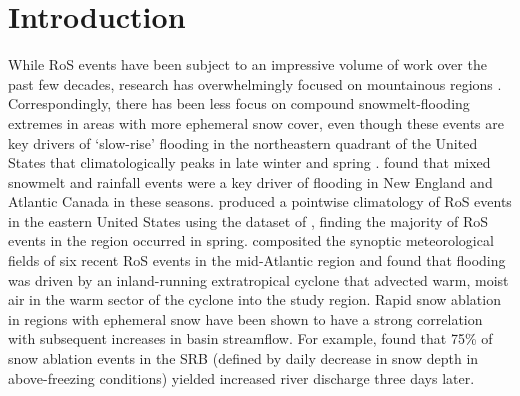 \documentclass[draft]{agujournal2019}
\begin{document}

%
%
%
%


\section{Introduction}

While RoS events have been subject to an impressive volume of work over the past few decades, research has overwhelmingly focused on mountainous regions \citep{singh1997hydrological,mccabe2007rain,musselman2018projected}. Correspondingly, there has been less focus on compound snowmelt-flooding extremes in areas with more ephemeral snow cover, even though these events are key drivers of `slow-rise' flooding in the northeastern quadrant of the United States that climatologically peaks in late winter and spring \citep{ashley2008flood,villarini2010flood,dougherty2019climatology}. \citet{collins2014annual} found that mixed snowmelt and rainfall events were a key driver of flooding in New England and Atlantic Canada in these seasons. \citet{wachowicz2020rain} produced a pointwise climatology of RoS events in the eastern United States using the dataset of \citet{dyer2006spatial}, finding the majority of RoS events in the region occurred in spring. \citet{grote2021synoptic} composited the synoptic meteorological fields of six recent RoS events in the mid-Atlantic region and found that flooding was driven by an inland-running extratropical cyclone that advected warm, moist air in the warm sector of the cyclone into the study region. Rapid snow ablation in regions with ephemeral snow have been shown to have a strong correlation with subsequent increases in basin streamflow. For example, \citet{suriano2020discharge} found that 75\% of snow ablation events in the SRB (defined by daily decrease in snow depth in above-freezing conditions) yielded increased river discharge three days later.
\end{document}
